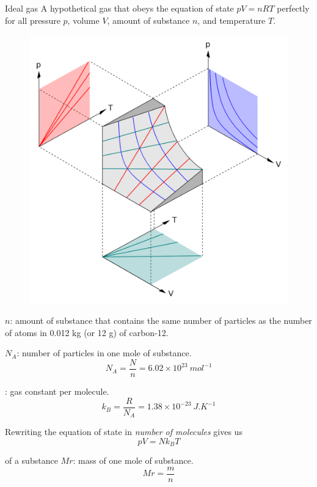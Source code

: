 \begin{defn}{Ideal gas}{}
A hypothetical gas that obeys the equation of state $pV = nRT$ perfectly for all pressure $p$, volume $V$, amount of substance $n$, and temperature $T$.
\end{defn}

\begin{figure}[H]
    \centering
    \includegraphics[width=14cm]{images/pVT-surface.png}
\end{figure}

 $n$: amount of substance that contains the same number of particles as the number of atoms in 0.012 kg (or 12 g) of carbon-12.

 $N_A$: number of particles in one mole of substance.
\[ N_A = \frac{N}{n} = 6.02 \times 10^{23} \: \unit{mol^{-1}} \]

: gas constant per molecule.
\[ k_B = \frac{R}{N_A} = 1.38\times10^{-23} \: \unit{J.K^{-1}} \]

Rewriting the equation of state in \emph{number of molecules} gives us
\begin{equation}
pV=Nk_BT
\end{equation}

 of a substance $Mr$: mass of one mole of substance.
\[ Mr = \frac{m}{n} \]

